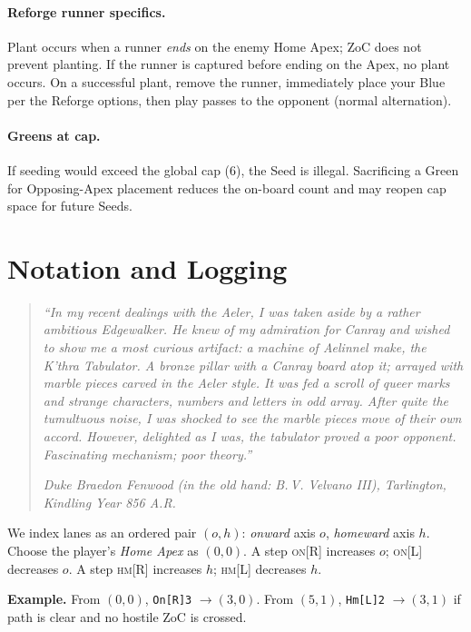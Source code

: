 \documentclass[11pt]{article}
\begin{document}
\paragraph{Reforge runner specifics.}
Plant occurs when a runner \emph{ends} on the enemy Home Apex; ZoC does not prevent planting. If the runner is captured before ending on the Apex, no plant occurs. On a successful plant, remove the runner, immediately place your Blue per the Reforge options, then play passes to the opponent (normal alternation).

\paragraph{Greens at cap.}
If seeding would exceed the global cap (6), the Seed is illegal. Sacrificing a Green for Opposing-Apex placement reduces the on-board count and may reopen cap space for future Seeds.

\bigskip

\clearpage

\section{Notation and Logging}
\label{sec:notation}

\begin{quote}\small\itshape
“In my recent dealings with the Aeler, I was taken aside by a rather ambitious Edgewalker. He knew of my admiration for Canray and wished to show me a most curious artifact: a machine of Aelinnel make, the K’thra Tabulator. A bronze pillar with a Canray board atop it; arrayed with marble pieces carved in the Aeler style. It was fed a scroll of queer marks and strange characters, numbers and letters in odd array. After quite the tumultuous noise, I was shocked to see the marble pieces move of their own accord. However, delighted as I was, the tabulator proved a poor opponent. Fascinating mechanism; poor theory.”

\hfill\emph{Duke Braedon Fenwood (in the old hand: B.\,V. Velvano III), Tarlington, Kindling Year 856 A.R.}
\end{quote}

\begin{tcolorbox}[enhanced,breakable,title={(o,h) Coordinates — Minimal Reference},
  colback=white,colframe=royal,boxrule=0.8pt]
\small
We index lanes as an ordered pair $(o,h)$: \emph{onward} axis $o$, \emph{homeward} axis $h$.
Choose the player’s \emph{Home Apex} as $(0,0)$. A step \textsc{on}[R] increases $o$; \textsc{on}[L] decreases $o$. A step \textsc{hm}[R] increases $h$; \textsc{hm}[L] decreases $h$.

\textbf{Example.} From $(0,0)$, \texttt{On[R]3} $\to (3,0)$. From $(5,1)$, \texttt{Hm[L]2} $\to (3,1)$ if path is clear and no hostile ZoC is crossed.
\end{tcolorbox}
\end{document}
